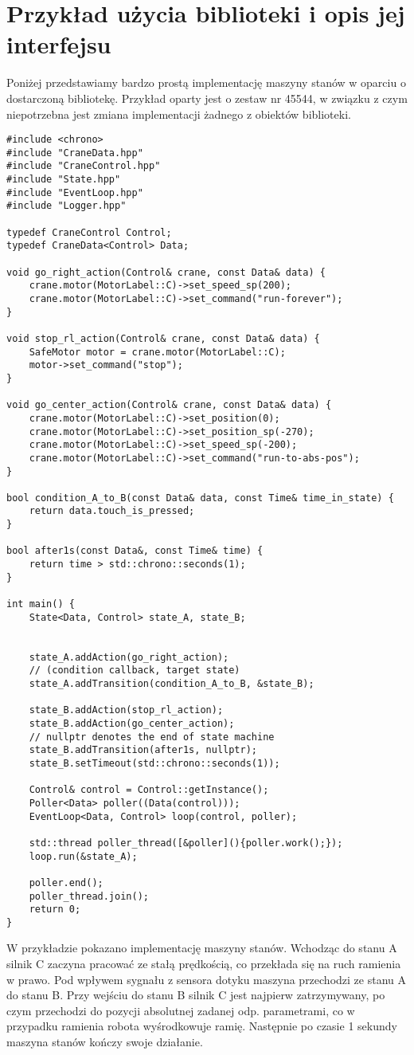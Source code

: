 \documentclass{article}
\begin{document}
\section{Przykład użycia biblioteki i opis jej interfejsu}\label{user_api}
Poniżej przedstawiamy bardzo prostą implementację maszyny stanów w oparciu o dostarczoną
bibliotekę. Przykład oparty jest o zestaw nr 45544, w związku z czym
niepotrzebna jest zmiana implementacji żadnego z obiektów biblioteki.
\begin{lstlisting}
#include <chrono>
#include "CraneData.hpp"
#include "CraneControl.hpp"
#include "State.hpp"
#include "EventLoop.hpp"
#include "Logger.hpp"

typedef CraneControl Control;
typedef CraneData<Control> Data;

void go_right_action(Control& crane, const Data& data) {
    crane.motor(MotorLabel::C)->set_speed_sp(200);
    crane.motor(MotorLabel::C)->set_command("run-forever");
}

void stop_rl_action(Control& crane, const Data& data) {
    SafeMotor motor = crane.motor(MotorLabel::C);
    motor->set_command("stop");
}

void go_center_action(Control& crane, const Data& data) {
    crane.motor(MotorLabel::C)->set_position(0);
    crane.motor(MotorLabel::C)->set_position_sp(-270);
    crane.motor(MotorLabel::C)->set_speed_sp(-200);
    crane.motor(MotorLabel::C)->set_command("run-to-abs-pos");
}

bool condition_A_to_B(const Data& data, const Time& time_in_state) {
    return data.touch_is_pressed;
}

bool after1s(const Data&, const Time& time) {
    return time > std::chrono::seconds(1);
}

int main() {
    State<Data, Control> state_A, state_B;


    state_A.addAction(go_right_action);
    // (condition callback, target state)
    state_A.addTransition(condition_A_to_B, &state_B);

    state_B.addAction(stop_rl_action);
    state_B.addAction(go_center_action);
    // nullptr denotes the end of state machine
    state_B.addTransition(after1s, nullptr);
    state_B.setTimeout(std::chrono::seconds(1));

    Control& control = Control::getInstance();
    Poller<Data> poller((Data(control)));
    EventLoop<Data, Control> loop(control, poller);

    std::thread poller_thread([&poller](){poller.work();});
    loop.run(&state_A);

    poller.end();
    poller_thread.join();
    return 0;
}
\end{lstlisting}
W przykładzie pokazano implementację maszyny stanów. Wchodząc do stanu A silnik
C zaczyna pracować ze stałą prędkością, co przekłada się na ruch ramienia w
prawo. Pod wpływem sygnału z sensora dotyku maszyna przechodzi ze stanu A do
stanu B. Przy wejściu do stanu B silnik C jest najpierw zatrzymywany, po czym
przechodzi do pozycji absolutnej zadanej odp. parametrami, co w przypadku
ramienia robota wyśrodkowuje ramię. Następnie po czasie 1 sekundy maszyna stanów
kończy swoje działanie.\\
\end{document}
